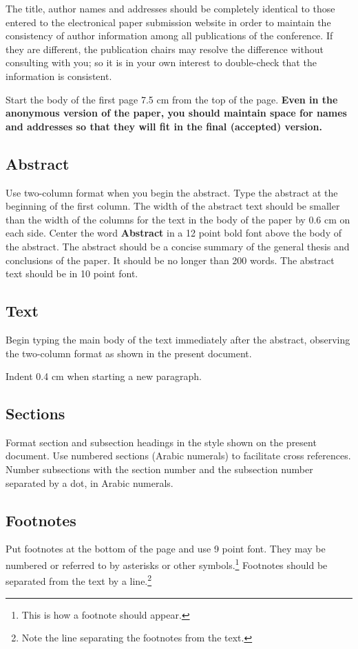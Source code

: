 \documentclass[11pt,a4paper]{article}
\begin{document}
	The title, author names and addresses should be completely identical to those entered to the electronical paper submission website in order to maintain the consistency of author information among all publications of the conference.
	If they are different, the publication chairs may resolve the difference without consulting with you; so it is in your own interest to double-check that the information is consistent.
	
	Start the body of the first page 7.5 cm from the top of the page.
	\textbf{Even in the anonymous version of the paper, you should maintain space for names and addresses so that they will fit in the final (accepted) version.}
	
	
	\subsection{Abstract}
	Use two-column format when you begin the abstract.
	Type the abstract at the beginning of the first column.
	The width of the abstract text should be smaller than the
	width of the columns for the text in the body of the paper by 0.6 cm on each side.
	Center the word \textbf{Abstract} in a 12 point bold font above the body of the abstract.
	The abstract should be a concise summary of the general thesis and conclusions of the paper.
	It should be no longer than 200 words.
	The abstract text should be in 10 point font.
	
	\subsection{Text}
	Begin typing the main body of the text immediately after the abstract, observing the two-column format as shown in the present document.
	
	Indent 0.4 cm when starting a new paragraph.
	
	\subsection{Sections}
	
	Format section and subsection headings in the style shown on the present document.
	Use numbered sections (Arabic numerals) to facilitate cross references.
	Number subsections with the section number and the subsection number separated by a dot, in Arabic numerals.
	
	\subsection{Footnotes}
	Put footnotes at the bottom of the page and use 9 point font.
	They may be numbered or referred to by asterisks or other symbols.\footnote{This is how a footnote should appear.}
	Footnotes should be separated from the text by a line.\footnote{Note the line separating the footnotes from the text.}
	
\end{document}
